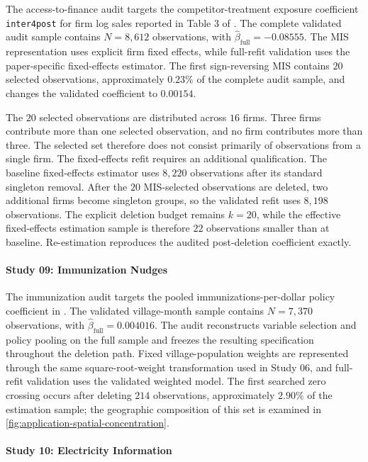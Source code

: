 \documentclass[../main.tex]{subfiles}
\begin{document}
The access-to-finance audit targets the competitor-treatment exposure coefficient \texttt{inter4post} for firm log sales reported in Table 3 of \textcite{cai2024indirect}. The complete validated audit sample contains \(N=8{,}612\) observations, with \(\widehat{\beta}_{\mathrm{full}}=-0.08555\). The MIS representation uses explicit firm fixed effects, while full-refit validation uses the paper-specific fixed-effects estimator. The first sign-reversing MIS contains \(20\) selected observations, approximately \(0.23\%\) of the complete audit sample, and changes the validated coefficient to \(0.00154\).

The \(20\) selected observations are distributed across \(16\) firms. Three firms contribute more than one selected observation, and no firm contributes more than three. The selected set therefore does not consist primarily of observations from a single firm. The fixed-effects refit requires an additional qualification. The baseline fixed-effects estimator uses \(8{,}220\) observations after its standard singleton removal. After the \(20\) MIS-selected observations are deleted, two additional firms become singleton groups, so the validated refit uses \(8{,}198\) observations. The explicit deletion budget remains \(k=20\), while the effective fixed-effects estimation sample is therefore \(22\) observations smaller than at baseline. Re-estimation reproduces the audited post-deletion coefficient exactly.

\paragraph*{Study 09: Immunization Nudges}

The immunization audit targets the pooled immunizations-per-dollar policy coefficient in \textcite{banerjee2025selecting}. The validated village-month sample contains \(N=7{,}370\) observations, with \(\widehat{\beta}_{\mathrm{full}}=0.004016\). The audit reconstructs variable selection and policy pooling on the full sample and freezes the resulting specification throughout the deletion path. Fixed village-population weights are represented through the same square-root-weight transformation used in Study 06, and full-refit validation uses the validated weighted model. The first searched zero crossing occurs after deleting \(214\) observations, approximately \(2.90\%\) of the estimation sample; the geographic composition of this set is examined in \autoref{fig:application-spatial-concentration}.

\paragraph*{Study 10: Electricity Information}
\end{document}
